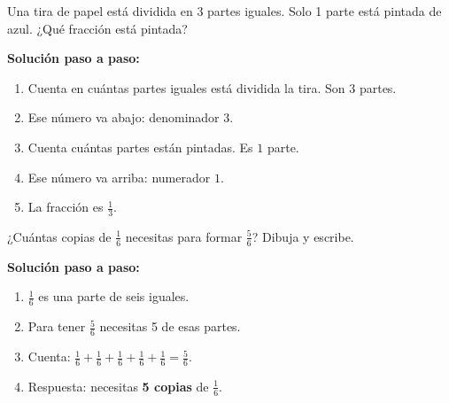 \begin{wbexample}
Una tira de papel está dividida en 3 partes iguales. Solo 1 parte está pintada de azul. ¿Qué fracción está pintada?

\begin{center}
\end{center}

\textbf{Solución paso a paso:}
\begin{enumerate}
\item Cuenta en cuántas partes iguales está dividida la tira. Son $3$ partes.
\item Ese número va abajo: denominador $3$.
\item Cuenta cuántas partes están pintadas. Es $1$ parte.
\item Ese número va arriba: numerador $1$.
\item La fracción es $\frac{1}{3}$.
\end{enumerate}
\end{wbexample}

\begin{wbexample}
¿Cuántas copias de $\frac{1}{6}$ necesitas para formar $\frac{5}{6}$? Dibuja y escribe.

\textbf{Solución paso a paso:}
\begin{enumerate}
\item $\frac{1}{6}$ es una parte de seis iguales.
\begin{center}
\end{center}
\item Para tener $\frac{5}{6}$ necesitas 5 de esas partes.
\begin{center}
\end{center}
\item Cuenta: $\frac{1}{6} + \frac{1}{6} + \frac{1}{6} + \frac{1}{6} + \frac{1}{6} = \frac{5}{6}$.
\item Respuesta: necesitas \textbf{5 copias} de $\frac{1}{6}$.
\end{enumerate}
\end{wbexample}

